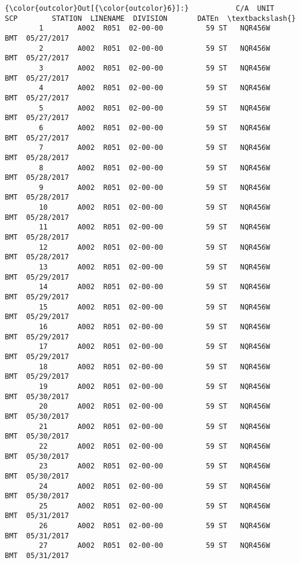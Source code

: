 \documentclass[11pt]{article}
\begin{document}
\begin{Verbatim}[commandchars=\\\{\}]
{\color{outcolor}Out[{\color{outcolor}6}]:}           C/A  UNIT       SCP        STATION  LINENAME  DIVISION       DATEn  \textbackslash{}
        1        A002  R051  02-00-00          59 ST   NQR456W       BMT  05/27/2017   
        2        A002  R051  02-00-00          59 ST   NQR456W       BMT  05/27/2017   
        3        A002  R051  02-00-00          59 ST   NQR456W       BMT  05/27/2017   
        4        A002  R051  02-00-00          59 ST   NQR456W       BMT  05/27/2017   
        5        A002  R051  02-00-00          59 ST   NQR456W       BMT  05/27/2017   
        6        A002  R051  02-00-00          59 ST   NQR456W       BMT  05/27/2017   
        7        A002  R051  02-00-00          59 ST   NQR456W       BMT  05/28/2017   
        8        A002  R051  02-00-00          59 ST   NQR456W       BMT  05/28/2017   
        9        A002  R051  02-00-00          59 ST   NQR456W       BMT  05/28/2017   
        10       A002  R051  02-00-00          59 ST   NQR456W       BMT  05/28/2017   
        11       A002  R051  02-00-00          59 ST   NQR456W       BMT  05/28/2017   
        12       A002  R051  02-00-00          59 ST   NQR456W       BMT  05/28/2017   
        13       A002  R051  02-00-00          59 ST   NQR456W       BMT  05/29/2017   
        14       A002  R051  02-00-00          59 ST   NQR456W       BMT  05/29/2017   
        15       A002  R051  02-00-00          59 ST   NQR456W       BMT  05/29/2017   
        16       A002  R051  02-00-00          59 ST   NQR456W       BMT  05/29/2017   
        17       A002  R051  02-00-00          59 ST   NQR456W       BMT  05/29/2017   
        18       A002  R051  02-00-00          59 ST   NQR456W       BMT  05/29/2017   
        19       A002  R051  02-00-00          59 ST   NQR456W       BMT  05/30/2017   
        20       A002  R051  02-00-00          59 ST   NQR456W       BMT  05/30/2017   
        21       A002  R051  02-00-00          59 ST   NQR456W       BMT  05/30/2017   
        22       A002  R051  02-00-00          59 ST   NQR456W       BMT  05/30/2017   
        23       A002  R051  02-00-00          59 ST   NQR456W       BMT  05/30/2017   
        24       A002  R051  02-00-00          59 ST   NQR456W       BMT  05/30/2017   
        25       A002  R051  02-00-00          59 ST   NQR456W       BMT  05/31/2017   
        26       A002  R051  02-00-00          59 ST   NQR456W       BMT  05/31/2017   
        27       A002  R051  02-00-00          59 ST   NQR456W       BMT  05/31/2017   

\end{Verbatim}
\end{document}
